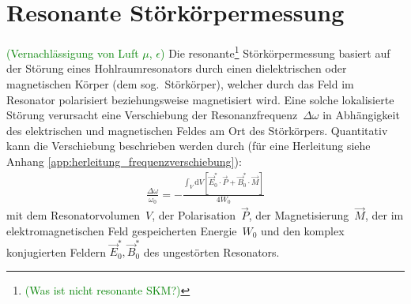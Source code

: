 \documentclass[11pt, a4paper]{scrbook}
\newcommand{\ve}{\vec{E}}
\newcommand{\vb}{\vec{B}}
\newcommand{\todo}[1]{{\textcolor{Green}{(#1)}}}
\begin{document}
	\section{Resonante Störkörpermessung}
	\todo{Vernachlässigung von Luft $\mu$, $\epsilon$}
	Die resonante\footnote{\todo{Was ist nicht resonante SKM?}} Störkörpermessung basiert auf der Störung eines Hohlraumresonators durch einen dielektrischen oder magnetischen Körper (dem sog.\ Störkörper), welcher durch das Feld im Resonator polarisiert beziehungsweise magnetisiert wird.
	Eine solche lokalisierte Störung verursacht eine Verschiebung der Resonanzfrequenz~$\Delta \omega$ in Abhängigkeit des elektrischen und magnetischen Feldes am Ort des Störkörpers.
	Quantitativ kann die Verschiebung beschrieben werden durch (für eine Herleitung siehe Anhang \ref{app:herleitung_frequenzverschiebung}):
	\begin{align}
		\frac{\Delta \omega}{\omega_0} = - \frac{\int_V \mathrm{d}V \left[ \ve_0^* \cdot \vec{P} + \vb_0^* \cdot \vec{M} \right]}{4 W_0}
		\label{eq:frequenzverschiebung}
	\end{align}
	mit dem Resonatorvolumen~$V$, der Polarisation~$\vec{P}$, der Magnetisierung~$\vec{M}$, der im elektromagnetischen Feld gespeicherten Energie~$W_0$ und den komplex konjugierten Feldern $\ve_0^*, \vb_0^*$ des ungestörten Resonators.
	
\end{document}
